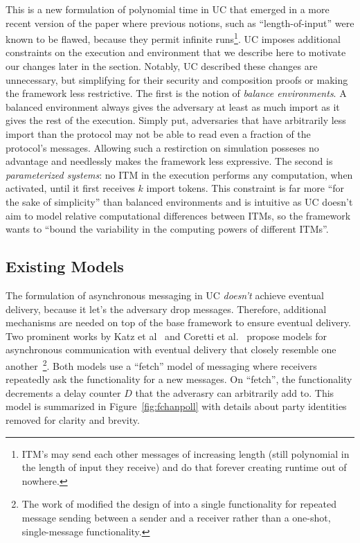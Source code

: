 This is a new formulation of polynomial time in UC that emerged in a more recent version of the paper where previous notions, such as ``length-of-input'' were known to be flawed, because they permit infinite runs\footnote{ITM's may send each other messages of increasing length (still polynomial in the length of input they receive) and do that forever creating runtime out of nowhere.}.
UC imposes additional constraints on the execution and environment that we describe here to motivate our changes later in the section.
Notably, UC described these changes are unnecessary, but simplifying for their security and composition proofs or making the framework less restrictive. 
The first is the notion of \emph{balance environments}. 
A balanced environment always gives the adversary at least as much import as it gives the rest of the execution.
Simply put, adversaries that have arbitrarily less import than the protocol may not be able to read even a fraction of the protocol's messages. 
Allowing such a restirction on simulation posseses no advantage and needlessly makes the framework less expressive.
The second is \emph{parameterized systems}: no ITM in the execution performs any computation, when activated, until it first receives $k$ import tokens.
This constraint is far more ``for the sake of simplicity'' than balanced environments and is intuitive as UC doesn't aim to model relative computational differences between ITMs, so the framework wants to ``bound the variability in the computing powers of different ITMs''.

\subsection{Existing Models}
The formulation of asynchronous messaging in UC \emph{doesn't} achieve eventual delivery, because it let's the adversary drop messages.
Therefore, additional mechanisms are needed on top of the base framework to ensure eventual delivery.
Two prominent works by Katz et al~\cite{katzuc} and Coretti et al.~\cite{corettimpc} propose models for asynchronous communication with eventual delivery that closely resemble one another~\footnote{The work of \cite{corettimpc} modified the design of \cite{katzuc} into a single functionality for repeated message sending between a sender and a receiver rather than a one-shot, single-message functionality.}.
Both models use a ``fetch'' model of messaging where receivers repeatedly ask the functionality for a new messages. 
On ``fetch'', the functionality decrements a delay counter $D$ that the adverasry can arbitrarily add to.
This model is summarized in Figure~\ref{fig:fchanpoll} with details about party identities removed for clarity and brevity.

